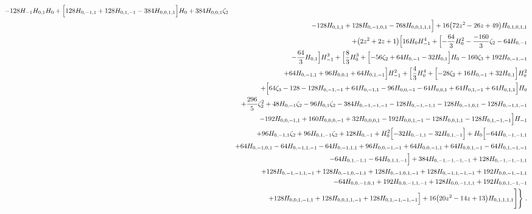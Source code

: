 \begin{eqnarray}
-128 H_{-1} H_{0,1} H_0+\Bigl[128 H_{0,-1,1}+128 H_{0,1,-1}-384 H_{0,0,1,1}\Bigr] H_0+384  H_{0,0,1} \zeta_2
\nonumber \\ &&
-128 H_{0,1,1}+128  H_{0,-1,0,1}-768  H_{0,0,1,1,1}\Bigr]+16 \big(72z^2-26 z+49\big) H_{0,1,0,1,1}
\nonumber \\ &&
+\big(2 z^2+2 z+1\big) \Bigl[16 H_0H_{-1}^4+\Bigl[-\frac{64}{3} H_0^2-\frac{-160}{3}\zeta_2-64 H_{0,-1}
\nonumber \\ &&
-\frac{64}{3} H_{0,1}\Bigr]H_{-1}^3+\Bigl[\frac{8}{3} H_0^3+\Bigl[-56 \zeta_2+64H_{0,-1}
-32 H_{0,1}\Bigr] H_0-160\zeta_3+192 H_{0,-1,-1}
\nonumber \\ &&
+64 H_{0,-1,1}+96 H_{0,0,1}+64 H_{0,1,-1}
\Bigr] H_{-1}^2+\Bigl[\frac{4}{3} H_0^4+\Bigl[-28  \zeta_2+16H_{0,-1}+32  H_{0,1}\Bigr] H_0^2
\nonumber \\ &&
+\Bigl[64\zeta_3-128 -128 H_{0,-1,-1}+64 H_{0,-1,1}-96H_{0,0,-1}
-64 H_{0,0,1}+64 H_{0,1,-1}+64 H_{0,1,1}\Bigr] H_0
\nonumber \\ &&
+\frac{296}{5} \zeta_2^2
+48 H_{0,-1} \zeta_2-96H_{0,1} \zeta_2-384 H_{0,-1,-1,-1}
-128H_{0,-1,-1,1}-128  H_{0,-1,0,1}-128H_{0,-1,1,-1}
\nonumber \\ &&
-192  H_{0,0,-1,1}
+160H_{0,0,0,-1}+32 H_{0,0,0,1}
-192  H_{0,0,1,-1}-128 H_{0,0,1,1}-128 H_{0,1,-1,-1}
\Bigr] H_{-1}
\nonumber \\ &&
+96H_{0,-1,1} \zeta_2
+96 H_{0,1,-1} \zeta_2+128 H_{0,-1}
+H_0^2 \Bigl[-32  H_{0,-1,1}-32  H_{0,1,-1}\Bigr]
+H_0\Bigl[-64 H_{0,-1,-1,1}
\nonumber \\ &&
+64 H_{0,-1,0,1}
-64 H_{0,-1,1,-1}
-64 H_{0,-1,1,1}+96H_{0,0,-1,-1}+64 H_{0,0,-1,1}
+64 H_{0,0,1,-1}-64H_{0,1,-1,-1}
\nonumber \\ &&
-64 H_{0,1,-1,1}
-64H_{0,1,1,-1}\Bigr]
+384 H_{0,-1,-1,-1,-1}
+128H_{0,-1,-1,-1,1}
\nonumber \\ &&
+128 H_{0,-1,-1,1,-1}+128  H_{0,-1,0,-1,1}
+128 H_{0,-1,0,1,-1}+128 H_{0,-1,1,-1,-1}
+192 H_{0,0,-1,-1,1}
\nonumber \\ &&
-64  H_{0,0,-1,0,1}+192  H_{0,0,-1,1,-1}+128 H_{0,0,-1,1,1}
+192  H_{0,0,1,-1,-1}
\nonumber \\ &&
+128  H_{0,0,1,-1,1}+128 H_{0,0,1,1,-1}+128 H_{0,1,-1,-1,-1}
\Bigr]
+16 \big(20 z^2-14 z+13\big) H_{0,1,1,1,1}\Biggr]\Biggr\}~.
%
%
\end{eqnarray}
